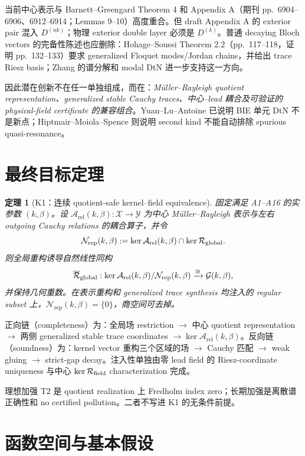 \documentclass[UTF8,11pt,fontset=none]{ctexart}
\newtheorem{theorem}{定理}
\theoremstyle{definition}
\newcommand{\G}{\mathcal G(k,\beta)}
\newcommand{\Arel}{\mathcal A_{\mathrm{rel}}(k,\beta)}
\newcommand{\Nrep}{\mathcal N_{\mathrm{rep}}(k,\beta)}
\begin{document}
当前中心表示与 Barnett--Greengard Theorem 4 和 Appendix A（期刊 pp.~6904--6906、6912--6914；Lemmas 9--10）高度重合\cite{BarnettGreengard2010}。但 draft Appendix A 的 exterior pair 混入 $D^{(nk)}$；物理 exterior double layer 必须是 $D^{(k)}$。普通 decaying Bloch vectors 的完备性陈述也应删除：Hohage--Soussi Theorem 2.2（pp.~117--118，证明 pp.~132--133）要求 generalized Floquet modes/Jordan chains，并给出 trace Riesz basis\cite{HohageSoussi2013}；Zhang 的谱分解和 modal DtN 进一步支持这一方向\cite{Zhang2021,Zhang2023}。

因此潜在创新不在任一单独组成，而在：\emph{Müller--Rayleigh quotient representation、generalized stable Cauchy traces、中心--lead 耦合及可验证的 physical-field certificate 的兼容组合}。Yuan--Lu--Antoine 已说明 BIE 单元 DtN 不是新点\cite{YuanLuAntoine2008}；Hiptmair--Moiola--Spence 则说明 second kind 不能自动排除 spurious quasi-resonance\cite{HiptmairMoiolaSpence2022}。

\section{最终目标定理}

\begin{theorem}[K1：连续 quotient-safe kernel--field equivalence]
固定满足 A1--A16 的实参数 $(k,\beta)$。设 $\Arel:\mathcal X\to\mathcal Y$ 为中心 Müller--Rayleigh 表示与左右 outgoing Cauchy relations 的耦合算子，并令
\[
\Nrep:=\ker\Arel\cap\ker\mathcal R_{\rm global}.
\]
则全局重构诱导自然线性同构
\[
 \overline{\mathcal R}_{\rm global}:\ker\Arel/\Nrep\xrightarrow{\cong}\G,
\]
并保持几何重数。在表示重构和 generalized trace synthesis 均注入的 regular subset 上，$\Nrep=\{0\}$，商空间可去掉。
\end{theorem}

正向链（completeness）为：全局场 restriction $\to$ 中心 quotient representation $\to$ 两侧 generalized stable trace coordinates $\to\ker\Arel$。反向链（soundness）为：kernel vector 重构三个区域的场 $\to$ Cauchy 匹配 $\to$ weak gluing $\to$ strict-gap decay。注入性单独由零 lead field 的 Riesz-coordinate uniqueness 与中心 $\ker\mathcal R_{\rm field}$ characterization 完成。

理想加强 T2 是 quotient realization 上 Fredholm index zero；长期加强是离散谱正确性和 no certified pollution。二者不写进 K1 的无条件前提。

\section{函数空间与基本假设}
\end{document}
